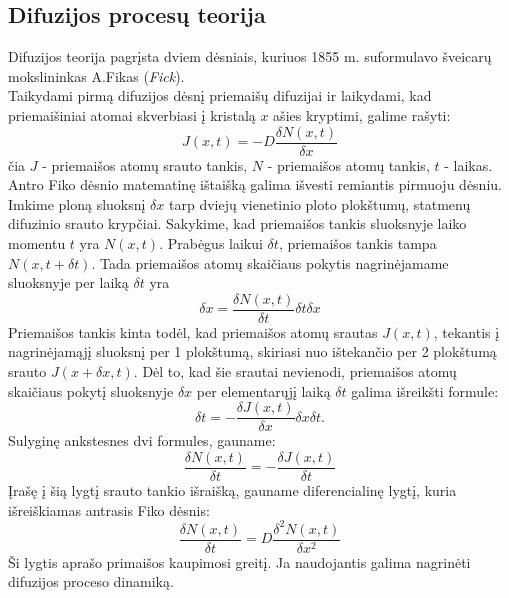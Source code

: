 \documentclass[11pt,a4paper]{article}
\begin{document}
\subsection{Difuzijos procesų teorija}
Difuzijos teorija pagrįsta dviem dėsniais, kuriuos 1855 m. suformulavo šveicarų mokslininkas A.Fikas (\emph{Fick}).\\

Taikydami pirmą difuzijos dėsnį priemaišų difuzijai ir laikydami, kad priemaišiniai atomai skverbiasi į kristalą $x$ ašies kryptimi, galime rašyti:
\begin{equation} 
  J(x,t) = - D \frac{\delta N(x,t)}{\delta x}
\end{equation}
čia $J$ - priemaišos atomų srauto tankis, $N$ - priemaišos atomų tankis, $t$ - laikas.\\

Antro Fiko dėsnio matematinę ištaišką galima išvesti remiantis pirmuoju dėsniu.\\

Imkime ploną sluoksnį $\delta x$ tarp dviejų vienetinio ploto plokštumų, statmenų difuzinio srauto krypčiai. 
Sakykime, kad priemaišos tankis sluoksnyje laiko momentu $t$ yra $N(x,t)$. Prabėgus laikui $\delta t$, 
priemaišos tankis tampa $N(x,t+ \delta t)$. Tada priemaišos atomų skaičiaus pokytis nagrinėjamame sluoksnyje per laiką $\delta t$ yra
\begin{equation}
[ N (x,t+\delta t ) - N(x,t) ] \delta x = \frac{\delta N(x,t)}{\delta t} \delta t \delta x
\end{equation}
Priemaišos tankis kinta todėl, kad priemaišos atomų srautas $J(x,t)$, tekantis į nagrinėjamąjį sluoksnį per 1 plokštumą, 
skiriasi nuo ištekančio per 2 plokštumą srauto $J(x+\delta x,t)$. Dėl to, kad šie srautai nevienodi, 
priemaišos atomų skaičiaus pokytį sluoksnyje $\delta x$ per elementarųjį laiką $\delta t$ galima išreikšti formule:
\begin{equation}
 [J(x,t) - J(x + \delta x,t ) ] \delta t = - \frac{\delta J(x,t)}{\delta x} \delta x \delta t. 
\end{equation}
Sulyginę ankstesnes dvi formules, gauname:
\begin{equation}
\frac{\delta N(x,t)}{\delta t} = - \frac{\delta J(x,t)}{\delta t} 
\end{equation}
Įrašę į šią lygtį srauto tankio išraišką, gauname diferencialinę lygtį, kuria išreiškiamas antrasis Fiko dėsnis:
\begin{equation}
\frac{\delta N(x,t)}{\delta t} = D \frac{\delta^2 N(x,t)}{\delta x^2} 
\end{equation}
Ši lygtis aprašo primaišos kaupimosi greitį. Ja naudojantis galima nagrinėti difuzijos proceso dinamiką.\\
\end{document}
